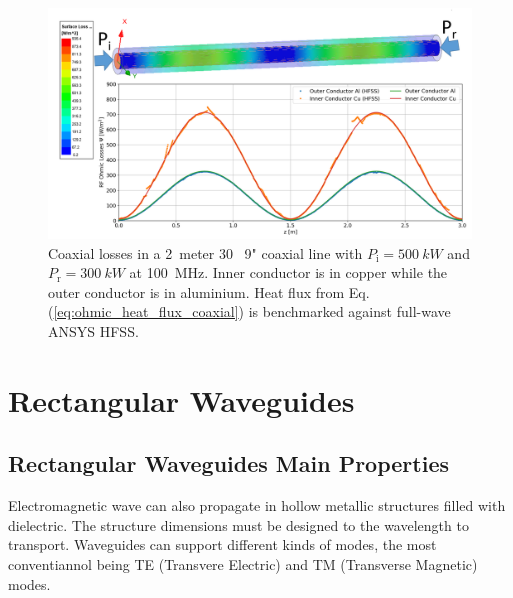 \begin{figure}
	\centering
	\includegraphics[width=1.0\linewidth]{figures/chap3/coaxial_losses}
	\caption{Coaxial losses in a 2~meter 30~\si{\Omega} 9" coaxial line with $P_\mathrm{i}=500~\si{kW}$ and  $P_\mathrm{r}=300~\si{kW}$ at 100~\si{MHz}. Inner conductor is in copper while the outer conductor is in aluminium. Heat flux from Eq.(\ref{eq:ohmic_heat_flux_coaxial}) is benchmarked against full-wave ANSYS HFSS.}
	\label{fig:coaxial_losses}
\end{figure}


\section{Rectangular Waveguides}\label{sec:rectangular_waveguide}
\subsection{Rectangular Waveguides Main Properties}
Electromagnetic wave can also propagate in hollow metallic structures filled with dielectric. The structure dimensions must be designed to the wavelength to transport. Waveguides can support different kinds of modes, the most conventiannol being TE (Transvere Electric) and TM (Transverse Magnetic) modes. 

